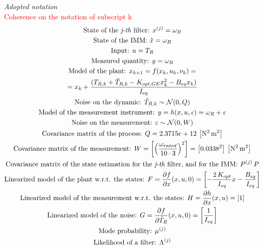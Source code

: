 \textit{Adopted notation}\\
\textcolor{red}{Coherence on the notation of subscript k}
\begin{multline}
  \text{State of the \textit{j-th} filter: } x^{(j)} = \omega_{R} \\
  \text{State of the IMM: } \hat{x} = \omega_R\\
  \text{Input: } u = T_{R}\\
  \text{Measured quantity: } y = \omega_{R} \\
  \text{Model of the plant: }  x_{k+1} = f(x_k, u_k, \nu_k) = \\ \notag
  = x_k + \frac{(T_{R,k} + \tilde{T}_{R,k} - K_{opt,GE}x_k^2 - B_{eq}x_k)}{I_{eq}}\\
  \text{Noise on the dynamic: } \tilde{T}_{R,k} \sim \mathcal{N}(0, Q) \\ \label{eq:noise_Q}
  \text{Model of the measurement instrument: } y = h(x, u, \varepsilon) = \omega_{R} + \varepsilon \\
  \text{Noise on the measurement: } \varepsilon \sim \mathcal{N}(0, W)  \\
  \text{Covariance matrix of the process: } Q = 2.3715e+12 \, \left[\si{\square\newton\square \meter}\right]\\
  \text{Covariance matrix of the measurement: } W = \left[\left(\frac{\omega_{rated}}{10 \cdot3}\right)^2\right] = \left[0.0338^2\right] \, \left[\si{\square\newton\square \meter}\right]\\
  \text{Covariance matrix of the state estimation for the \textit{j-th} filter, and for the IMM: } P^{(j)} \, P\\
  \text{Linearized model of the plant w.r.t. the states: } F = \frac{\partial f}{\partial x}(x, u, 0) = \left[-\frac{2\,K_{opt}}{I_{eq}}x - \frac{B_{eq}}{I_{eq}}\right]\\
  \text{Linearized model of the measurement w.r.t. the states: } H = \frac{\partial h}{\partial x}(x, u) = \left[1\right]\\
  \text{Linearized model of the noise: } G = \frac{\partial f}{\partial \tilde{T}_R}(x, u, 0)=\left[\frac{1}{I_{eq}}\right]\\
  \text{Mode probability: } \mu^{(j)}\\
  \text{Likelihood of a filter: } \Lambda^{(j)}
\end{multline}

